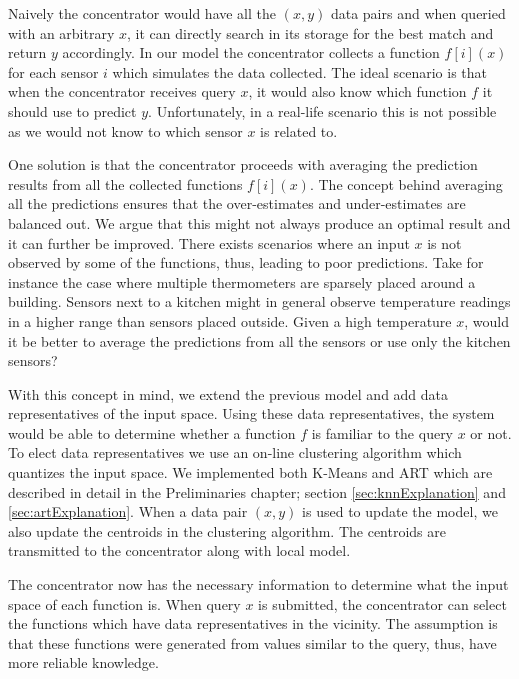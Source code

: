 \documentclass{mproj}
\begin{document}
Naively the concentrator would have all the $(x,y)$ data pairs and when queried with an arbitrary $x$, it can directly search in its storage for the best match and return $y$ accordingly. In our model the concentrator collects a function $f[i](x)$ for each sensor $i$ which simulates the data collected. The ideal scenario is that when the concentrator receives query $x$, it would also know which function $f$ it should use to predict $y$. Unfortunately, in a real-life scenario this is not possible as we would not know to which sensor $x$ is related to.

One solution is that the concentrator proceeds with averaging the prediction results from all the collected functions $f[i](x)$. The concept behind averaging all the predictions ensures that the over-estimates and under-estimates are balanced out. We argue that this might not always produce an optimal result and it can further be improved. There exists scenarios where an input $x$ is not observed by some of the functions, thus, leading to poor predictions. Take for instance the case where multiple thermometers are sparsely placed around a building. Sensors next to a kitchen might in general observe temperature readings in a higher range than sensors placed outside. Given a high temperature $x$, would it be better to average the predictions from all the sensors or use only the kitchen sensors?

With this concept in mind, we extend the previous model and add data representatives of the input space. Using these data representatives, the system would be able to determine whether a function $f$ is familiar to the query $x$ or not. To elect data representatives we use an on-line clustering algorithm which quantizes the input space. We implemented both K-Means and ART which are described in detail in the Preliminaries chapter; section \ref{sec:knnExplanation} and \ref{sec:artExplanation}. When a data pair $(x,y)$ is used to update the model, we also update the centroids in the clustering algorithm. The centroids are transmitted to the concentrator along with local model.

The concentrator now has the necessary information to determine what the input space of each function is. When query $x$ is submitted, the concentrator can select the functions which have data representatives in the vicinity. The assumption is that these functions were generated from values similar to the query, thus, have more reliable knowledge.
\end{document}
